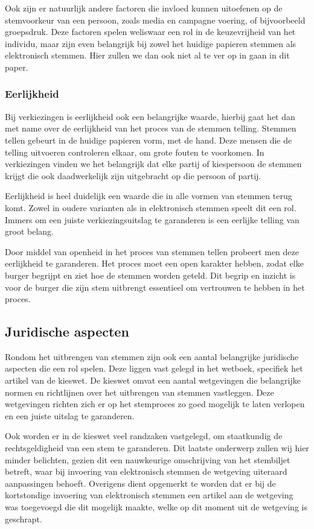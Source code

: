 \documentclass[a4paper]{article}
\begin{document}
Ook zijn er natuurlijk andere factoren die invloed kunnen uitoefenen op de stemvoorkeur van een persoon, zoals media en campagne voering, of bijvoorbeeld groepsdruk.
Deze factoren spelen weliswaar een rol in de keuzevrijheid van het individu, maar zijn even belangrijk bij zowel het huidige papieren stemmen als elektronisch stemmen.
Hier zullen we dan ook niet al te ver op in gaan in dit paper.

\subsubsection{Eerlijkheid}
Bij verkiezingen is eerlijkheid ook een belangrijke waarde, hierbij gaat het dan met name over de eerlijkheid van het proces van de stemmen telling.
Stemmen tellen gebeurt in de huidige papieren vorm, met de hand.
Deze mensen die de telling uitvoeren controleren elkaar, om grote fouten te voorkomen.
In verkiezingen vinden we het belangrijk dat elke partij of kiespersoon de stemmen krijgt die ook daadwerkelijk zijn uitgebracht op die persoon of partij.

Eerlijkheid is heel duidelijk een waarde die in alle vormen van stemmen terug komt.
Zowel in oudere varianten als in elektronisch stemmen speelt dit een rol.
Immers om een juiste verkiezingsuitslag te garanderen is een eerlijke telling van groot belang.

Door middel van openheid in het proces van stemmen tellen probeert men deze eerlijkheid te garanderen.
Het proces moet een open karakter hebben, zodat elke burger begrijpt en ziet hoe de stemmen worden geteld.
Dit begrip en inzicht is voor de burger die zijn stem uitbrengt essentieel om vertrouwen te hebben in het proces.

\subsection{Juridische aspecten}
Rondom het uitbrengen van stemmen zijn ook een aantal belangrijke juridische aspecten die een rol spelen.
Deze liggen vast gelegd in het wetboek, specifiek het artikel van de kieswet.
De kieswet omvat een aantal wetgevingen die belangrijke normen en richtlijnen over het uitbrengen van stemmen vastleggen.
Deze wetgevingen richten zich er op het stemproces zo goed mogelijk te laten verlopen en een juiste uitslag te garanderen.

Ook worden er in de kieswet veel randzaken vastgelegd, om staatkundig de rechtsgeldigheid van een stem te garanderen.
Dit laatste onderwerp zullen wij hier minder belichten, gezien dit een nauwkeurige omschrijving van het stembiljet betreft, waar bij invoering van elektronisch stemmen de wetgeving uiteraard aanpassingen behoeft.
Overigens dient opgemerkt te worden dat er bij de kortstondige invoering van elektronisch stemmen een artikel aan de wetgeving was toegevoegd die dit mogelijk maakte, welke op dit moment uit de wetgeving is geschrapt.
\end{document}
